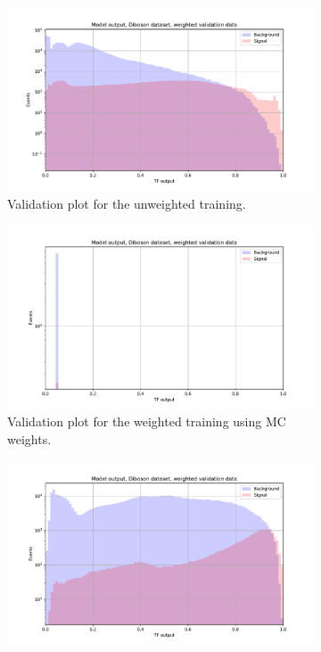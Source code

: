 \documentclass[14pt, a4paper]{book}
\begin{document}
\begin{figure}[!ht]
	\centering
	\begin{subfigure}[b]{0.49\textwidth}
        \centering
        \includegraphics[width=1\textwidth]{VAL_uw.pdf}
        \caption{Validation plot for the unweighted training.}\label{fig:DibosonVALUW}
     \end{subfigure}
     \hfill
     \begin{subfigure}[b]{0.49\textwidth}
        \centering
        \includegraphics[width=1\textwidth]{VAL_mc.pdf}
        \caption{Validation plot for the weighted training using MC weights.}\label{fig:DibosonVALMC}
     \end{subfigure}
     \begin{subfigure}[b]{0.49\textwidth}
        \centering
        \includegraphics[width=1\textwidth]{VAL_w.pdf}

\end{subfigure}
\end{figure}
\end{document}
